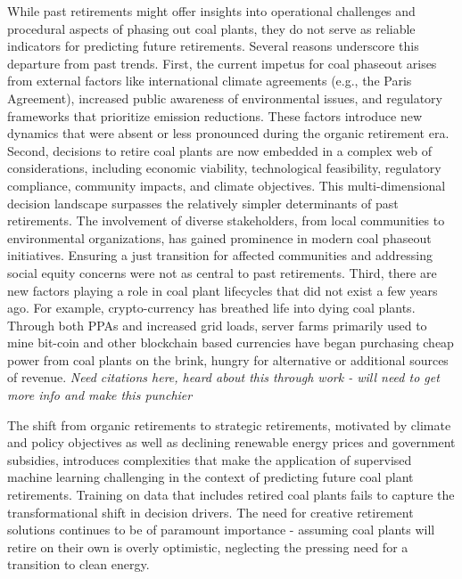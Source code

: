 While past retirements might offer insights into operational challenges and procedural aspects of phasing out 
coal plants, they do not serve as reliable indicators for predicting future retirements. Several reasons underscore 
this departure from past trends. First, the current impetus for coal phaseout arises from external factors like 
international climate agreements (e.g., the Paris Agreement), increased public awareness of environmental issues, 
and regulatory frameworks that prioritize emission reductions. These factors introduce new dynamics that were 
absent or less pronounced during the organic retirement era. Second, decisions to retire coal plants are now embedded 
in a complex web of considerations, including economic viability, technological feasibility, regulatory compliance, 
community impacts, and climate objectives. This multi-dimensional decision landscape surpasses the relatively simpler 
determinants of past retirements. The involvement of diverse stakeholders, from local communities to environmental 
organizations, has gained prominence in modern coal phaseout initiatives. Ensuring a just transition for affected 
communities and addressing social equity concerns were not as central to past retirements. Third, there are new factors playing
a role in coal plant lifecycles that did not exist a few years ago. For example, crypto-currency has breathed life into dying coal plants. 
Through both PPAs and increased grid loads, server farms primarily used to 
mine bit-coin and other blockchain based currencies have began purchasing cheap power from coal plants on the brink, hungry 
for alternative or additional sources of revenue. \textit{Need citations here, heard about this through work - will need 
to get more info and make this punchier}

The shift from organic retirements to strategic retirements, motivated by climate and policy objectives as well as declining renewable
energy prices and government subsidies, introduces complexities 
that make the application of supervised machine learning challenging in the context of predicting future coal plant retirements. 
Training on data that includes retired coal plants fails to capture the transformational shift in decision drivers. The need for 
creative retirement solutions continues to be of paramount importance - assuming coal plants will retire on their own is overly 
optimistic, neglecting the pressing need for a transition to clean energy.


